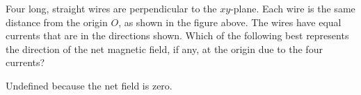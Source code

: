 \begin{questions}\setcounter{question}{31}\question
Four long, straight wires are perpendicular to the $x y$-plane. Each wire is the same distance from the origin $O$, as shown in the figure above. The wires have equal currents that are in the directions shown. Which of the following best represents the direction of the net magnetic field, if any, at the origin due to the four currents?

\begin{choices}
\choice {}
\choice {}
\choice {}
\choice {}
\choice Undefined because the net field is zero.
\end{choices}\end{questions}
